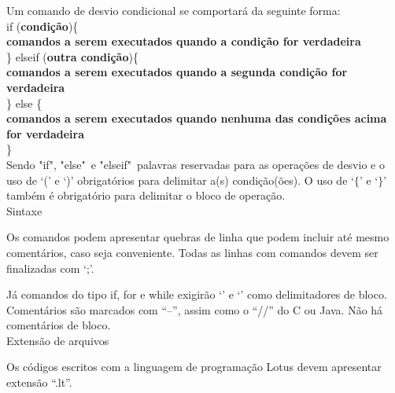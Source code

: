 \documentclass[12pt,a4paper]{article}
\def\emph#1{\textbf{#1}} %
\begin{document}
Um comando de desvio condicional se comportará da seguinte forma: \\

if (\emph{condição})\{ \\

\emph{comandos a serem executados quando a condição for verdadeira} \\

\} elseif (\emph{outra condição})\{\\

\emph{comandos a serem executados quando a segunda condição for verdadeira} \\

\} else \{\\


\emph{comandos a serem executados quando nenhuma das condições acima for verdadeira} \\

\}\\


Sendo "if", "else"\ e "elseif"\ palavras reservadas para as operações de desvio e o uso de `(' e `)' obrigatórios para delimitar a(s) condição(ões). O uso de `$\{$' e `$\}$' também é obrigatório para delimitar o bloco de operação.\\



\hypertarget{Sintaxe}{\Large{Sintaxe}}\\[0.3cm]
\normalsize

Os comandos podem apresentar quebras de linha que podem incluir até mesmo comentários, caso seja conveniente. Todas as linhas com comandos devem ser finalizadas com `;'.

Já comandos do tipo if, for e while exigirão `{' e `}' como delimitadores de bloco.
Comentários são marcados com ``--'', assim como o ``//'' do C ou Java. Não há comentários de bloco.\\


\hypertarget{Extensão de arquivos}{\Large{Extensão de arquivos}}\\[0.3cm]
\normalsize

Os códigos escritos com a linguagem de programação Lotus devem apresentar extensão ``.lt''.\\
\end{document}
